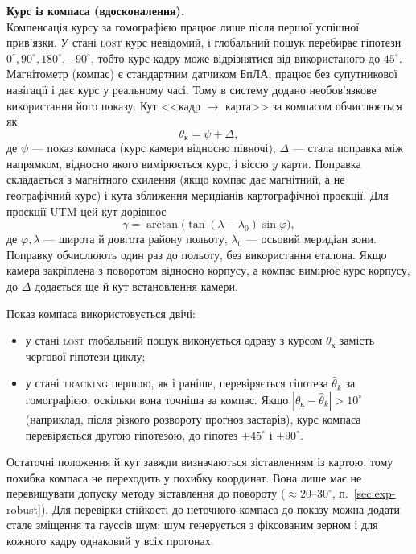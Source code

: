 \documentclass[a4paper, 12pt, titlepage]{article}
\begin{document}
\textbf{Курс із компаса (вдосконалення).}\\
Компенсація курсу за гомографією працює лише після першої успішної прив'язки. У стані \textsc{lost} курс невідомий, і глобальний пошук перебирає гіпотези $0^\circ, 90^\circ, 180^\circ, -90^\circ$, тобто курс кадру може відрізнятися від використаного до $45^\circ$. Магнітометр (компас) є стандартним датчиком БпЛА, працює без супутникової навігації і дає курс у реальному часі. Тому в систему додано необов'язкове використання його показу. Кут <<кадр $\to$ карта>> за компасом обчислюється як
\begin{equation}
\theta_{\text{к}} = \psi + \Delta,
\label{eq:compass}
\end{equation}
де $\psi$ --- показ компаса (курс камери відносно півночі), $\Delta$ --- стала поправка між напрямком, відносно якого вимірюється курс, і віссю $y$ карти. Поправка складається з магнітного схилення (якщо компас дає магнітний, а не географічний курс) і кута зближення меридіанів картографічної проєкції. Для проєкції UTM цей кут дорівнює
\begin{equation}
\gamma = \arctan\bigl(\tan(\lambda - \lambda_0) \sin\varphi\bigr),
\end{equation}
де $\varphi, \lambda$ --- широта й довгота району польоту, $\lambda_0$ --- осьовий меридіан зони. Поправку обчислюють один раз до польоту, без використання еталона. Якщо камера закріплена з поворотом відносно корпусу, а компас вимірює курс корпусу, до $\Delta$ додається ще й кут встановлення камери.

Показ компаса використовується двічі:
\begin{itemize}
    \item у стані \textsc{lost} глобальний пошук виконується одразу з курсом $\theta_{\text{к}}$ замість чергової гіпотези циклу;
    \item у стані \textsc{tracking} першою, як і раніше, перевіряється гіпотеза $\hat{\theta}_k$ за гомографією, оскільки вона точніша за компас. Якщо $|\theta_{\text{к}} - \hat{\theta}_k| > 10^\circ$ (наприклад, після різкого розвороту прогноз застарів), курс компаса перевіряється другою гіпотезою, до гіпотез $\pm 45^\circ$ і $\pm 90^\circ$.
\end{itemize}
Остаточні положення й кут завжди визначаються зіставленням із картою, тому похибка компаса не переходить у похибку координат. Вона лише має не перевищувати допуску методу зіставлення до повороту ($\approx 20$--$30^\circ$, п.~\ref{sec:exp-robust}). Для перевірки стійкості до неточного компаса до показу можна додати стале зміщення та гауссів шум; шум генерується з фіксованим зерном і для кожного кадру однаковий у всіх прогонах.
\end{document}
